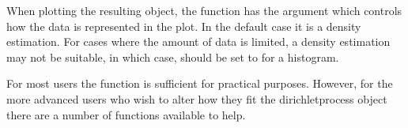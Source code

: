 \documentclass[nojss]{jss}
\begin{document}
When plotting the resulting object, the  function has the argument  which controls how the data is represented in the plot. In the default case it is a density estimation. For cases where the amount of data is limited, a density estimation may not be suitable, in which case,  should be set to  for a histogram.

For most users the  function is sufficient for practical purposes. However, for the more advanced users who wish to alter how they fit the dirichletprocess object there are a number of functions available to help.
\end{document}
